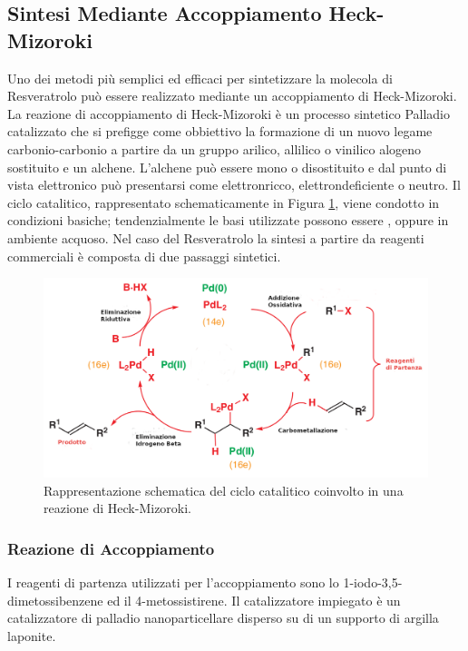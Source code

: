 \documentclass[a4paper, 12pt]{article}
\begin{document}
\subsection{Sintesi Mediante Accoppiamento Heck-Mizoroki}
Uno dei metodi più semplici ed efficaci per sintetizzare la molecola di Resveratrolo può essere realizzato mediante un accoppiamento di Heck-Mizoroki.
La reazione di accoppiamento di Heck-Mizoroki è un processo sintetico Palladio catalizzato che si prefigge come obbiettivo la formazione di un nuovo legame carbonio-carbonio a partire da un gruppo arilico, allilico o vinilico alogeno sostituito e un alchene. L'alchene può essere mono o disostituito e dal punto di vista elettronico può presentarsi come elettronricco, elettrondeficiente o neutro. Il ciclo catalitico, rappresentato schematicamente in Figura \ref{fig:heck}, viene condotto in condizioni basiche; tendenzialmente le basi utilizzate possono essere ,  oppure  in ambiente acquoso. \autocite{clayden_organic_2012}
Nel caso del Resveratrolo la sintesi a partire da reagenti commerciali è composta di due passaggi sintetici.

\begin{figure}[H]
	\centering
	\includegraphics[width=\linewidth]{immagini/heck.png}
	\caption{Rappresentazione schematica del ciclo catalitico coinvolto in una reazione di Heck-Mizoroki.}
	\label{fig:heck}
\end{figure}

\subsubsection{Reazione di Accoppiamento}
I reagenti di partenza utilizzati per l'accoppiamento sono lo 1-iodo-3,5-dimetossibenzene ed il 4-metossistirene. Il catalizzatore impiegato è un catalizzatore di palladio nanoparticellare disperso su di un supporto di argilla laponite.
\end{document}
